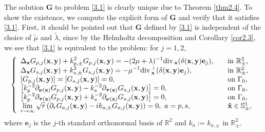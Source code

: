\documentclass[final,reqno]{siamltex}
\newcommand{\pa}{\partial}
\newcommand{\dive}{{\rm div\,}}
\newcommand{\mat}{\mathbb}
\newcommand{\R}{{\mat R}}
\newcommand{\Sp}{{\mat S}}
\newcommand{\be}{\begin{eqnarray}}
\newcommand{\en}{\end{eqnarray}}
\begin{document}
The solution $\mathbf{G}$ to problem \eqref{3.1} is clearly unique due to Theorem \ref{thm2.4}. To show the existence, we compute the explicit form of $\mathbf{G}$ and verify that it satisfies \eqref{3.1}. First, it should be pointed out that $\mathbf{G}$ defined by \eqref{3.1} is independent of the choice of $\tilde{\mu}$ and $\tilde{\lambda}$, since by the Helmholtz decomposition and Corollary \ref{cor2.3}, we see that \eqref{3.1} is equivalent to the problem: for $j=1,2$, 
\be\label{3.2}
  \left\{
  \begin{array}{ll}
  	\displaystyle\Delta_\mathbf{x}G_{p,j}(\mathbf{x},\mathbf{y})+k_{p,\pm}^2G_{p,j}(\mathbf{x},\mathbf{y})=-(2\mu+\lambda)^{-1}\dive_{\mathbf{x}}(\delta(\mathbf{x},\mathbf{y})\mathbf{e}_j),~~~&{\rm in}~\R^2_\pm,\\ 
  	\displaystyle\Delta_\mathbf{x}G_{s,j}(\mathbf{x},\mathbf{y})+k_{s,\pm}^2G_{s,j}(\mathbf{x},\mathbf{y})=-\mu^{-1}\dive_{\mathbf{x}}^\perp(\delta(\mathbf{x},\mathbf{y})\mathbf{e}_j),~~~&{\rm in}~\R^2_\pm,\\
  	\left[G_{p,j}(\mathbf{x},\mathbf{y})\right]=\left[G_{s,j}(\mathbf{x},\mathbf{y})\right]=0,~~~&{\rm on}~\Gamma_0, \\
  	\displaystyle\left[k_p^{-2}\pa_{\boldsymbol{\nu}(\mathbf{x})}G_{p,j}(\mathbf{x},\mathbf{y})-k_s^{-2}\pa_{\boldsymbol{\tau}(\mathbf{x})}G_{s,j}(\mathbf{x},\mathbf{y})\right]=0,~~~&{\rm on}~\Gamma_0, \\
  	\displaystyle\left[k_p^{-2}\pa_{\boldsymbol{\tau}(\mathbf{x})}G_{p,j}(\mathbf{x},\mathbf{y})+k_s^{-2}\pa_{\boldsymbol{\nu}(\mathbf{x})}G_{s,j}(\mathbf{x},\mathbf{y})\right]=0,~~~&{\rm on}~\Gamma_0, \\
  	\lim\limits_{r\rightarrow\infty}\sqrt{r}\left(\pa_rG_{a,j}(\mathbf{x},\mathbf{y})-ik_{a,\pm}G_{a,j}(\mathbf{x},\mathbf{y})\right)=0,~a=p,s,~~~&\mathbf{\hat x}\in\Sp^1_\pm, 
  \end{array}
  \right.
\en
where $\mathbf{e}_j$ is the $j$-th standard orthonormal basis of $\R^2$ and $k_a:=k_{a,\pm}$ in $\R^2_\pm$. 
\end{document}
